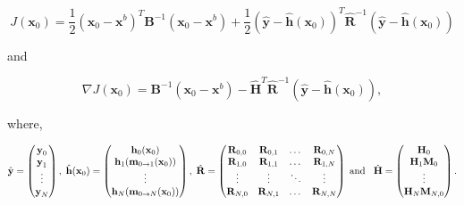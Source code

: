 \documentclass[review]{elsarticle}
\begin{document}
\begin{linenomath}
\begin{equation}
J(\textbf{x}_0) = \frac{1}{2}(\textbf{x}_0-\textbf{x}^b)^{T}\textbf{B}^{-1}(\textbf{x}_0-\textbf{x}^b)+\frac{1}{2}(\hat{\textbf{y}}-\hat{\textbf{h}}(\textbf{x}_0))^{T}\hat{\textbf{R}}^{-1}(\hat{\textbf{y}}-\hat{\textbf{h}}(\textbf{x}_0)) \label{costfn}
\end{equation}
\end{linenomath}
and
\begin{linenomath}
\begin{equation}
\nabla J(\textbf{x}_0) = \textbf{B}^{-1}(\textbf{x}_0-\textbf{x}^b)-\hat{\mathbf{H}}^{T}\hat{\textbf{R}}^{-1}(\hat{\textbf{y}}-\hat{\textbf{h}}(\textbf{x}_0)), \label{gradcostfn}
\end{equation}
\end{linenomath}
where,
\begin{linenomath}
\begin{equation}
\hat{\textbf{y}}=
\begin{pmatrix}
\textbf{y}_0 \\
\textbf{y}_1\\
\vdots \\
\textbf{y}_N
\end{pmatrix},
\hspace{1mm}
\hat{\textbf{h}}(\textbf{x}_0)=
\begin{pmatrix}
\textbf{h}_0(\textbf{x}_0) \\
\textbf{h}_1(\textbf{m}_{0\rightarrow 1}(\mathbf{x}_{0}))\\
\vdots \\
\textbf{h}_N(\textbf{m}_{0\rightarrow N}(\mathbf{x}_{0}))
\end{pmatrix},
\hspace{1mm}
\hat{\mathbf{R}}=
\begin{pmatrix}
\mathbf{R}_{0, 0} & \mathbf{R}_{0, 1} & \dots & \mathbf{R}_{0, N} \\
\mathbf{R}_{1, 0} & \mathbf{R}_{1, 1} & \dots & \mathbf{R}_{1, N} \\
\vdots & \vdots & \ddots & \vdots \\
\mathbf{R}_{N, 0} & \mathbf{R}_{N, 1} & \dots & \mathbf{R}_{N, N}
\end{pmatrix}
\hspace{1mm} \text{and} \hspace{3mm}
\hat{\mathbf{H}}=
\begin{pmatrix}
\mathbf{H}_0 \\
\mathbf{H}_1\mathbf{M}_0\\
\vdots \\
\mathbf{H}_N\mathbf{M}_{N,0}
\end{pmatrix}.
\end{equation}
\end{linenomath}
\end{document}
